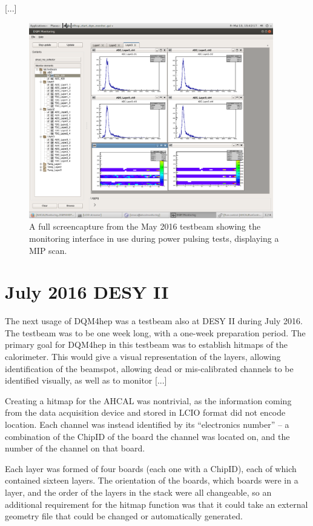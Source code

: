 [...] %

\begin{figure}
	\centering
	\includegraphics[width=0.95\textwidth]{../Pictures/PowerPulsingMipScans-May2016.png}
	\caption{A full screencapture from the May 2016 testbeam showing the monitoring interface in use during power pulsing tests, displaying a MIP scan.}
	\label{figure:aida/may2016/overview}
\end{figure}

\section{July 2016 DESY II}
The next usage of DQM4hep was a testbeam also at DESY II during July 2016. The testbeam was to be one week long, with a one-week preparation period. The primary goal for DQM4hep in this testbeam was to establish hitmaps of the calorimeter. This would give a visual representation of the layers, allowing identification of the beamspot, allowing dead or mis-calibrated channels to be identified visually, as well as to monitor [...]

Creating a hitmap for the AHCAL was nontrivial, as the information coming from the data acquisition device and stored in LCIO format did not encode location. Each channel was instead identified by its ``electronics number'' -- a combination of the ChipID of the board the channel was located on, and the number of the channel on that board.

Each layer was formed of four boards (each one with a ChipID), each of which contained sixteen layers. The orientation of the boards, which boards were in a layer, and the order of the layers in the stack were all changeable, so an additional requirement for the hitmap function was that it could take an external geometry file that could be changed or automatically generated. 

